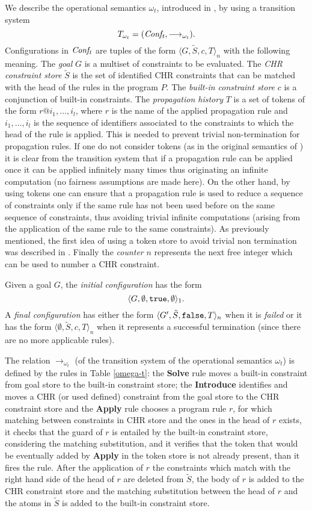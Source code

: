 \documentclass[final]{acmtrans2e}
\newcommand{\rrarrow}{\longrightarrow}
\begin{document}
We describe the operational semantics $\omega_t$, introduced in
\cite{DSGH04}, by using a transition system
\[T_{\omega_t}= ({\it Conf_t},
\rrarrow_{\omega_t}).\] Configurations in ${\it Conf_t}$ are
tuples of the form $\langle G,\tilde  S,c, T\rangle_n$ with the
following meaning. The \emph{goal} $G$ is a multiset of constraints to
be evaluated. The \emph{CHR constraint store} $\tilde S$ is the set of
identified CHR constraints that can be matched with the head of the
rules in the program $P$. The \emph{built-in constraint store} $c$ is a
conjunction of built-in constraints. The {\em propagation history}
$T$ is a set of tokens of the form $r@i_1, \ldots, i_l$, where $r$
is the name of the applied propagation rule and $i_1, \ldots, i_l$ is the
sequence of identifiers associated to the constraints to which the
head of the rule is applied. This is needed to prevent trivial
non-termination for propagation rules. If one do not consider
tokens (as in the original semantics of \cite{Fru98}) it is clear
from the transition system that if a propagation rule can be
applied once it can be applied infinitely many times thus
originating an infinite computation (no fairness assumptions are
made here). On the other hand, by using tokens one can ensure that
a propagation rule is used to reduce a sequence of constraints
only if the same rule has not been used before on the same
sequence of constraints, thus avoiding trivial infinite
computations (arising from the application of the same rule to the
same constraints). As previously mentioned, the first idea of using
a token store to avoid trivial non termination was described in
\cite{Abd97}. Finally the \emph{counter} $n$ represents the next
free integer which can be used to number a CHR constraint.


Given a goal $G$, the  {\em initial configuration} has the form
\[\langle G,\emptyset,{\tt true}, \emptyset \rangle_1.\]
A {\em final configuration} has either the form $\langle  G',
\tilde S, {\tt false} , T\rangle_n$ when it is {\em failed} or it
has the form $\langle \emptyset,\tilde S, c,T \rangle_n$ when it
represents a successful termination (since there are no more
applicable rules).


The relation $\rrarrow_{\omega_t}$ (of the transition system
of the operational semantics $\omega_t$) is defined  by the rules
in Table \ref{omega-t}: the \textbf{Solve} rule moves a
built-in constraint from goal store to the built-in constraint
store; the \textbf{Introduce} identifies and moves a CHR (or used
defined) constraint from the goal store to the CHR constraint
store and the \textbf{Apply} rule chooses a program rule $r$, for
which matching between constraints in CHR store and the ones in
the head of $r$ exists, it checks that the guard of $r$ is
entailed by the built-in constraint store, considering the
matching substitution, and it verifies that the token that would be
eventually added by \textbf{Apply} in the token store is not already
present, than it fires the rule. After the application of $r$
the constraints which match with the right hand side of the head
of $r$ are deleted from $\tilde S$, the body of $r$ is added to
the CHR constraint store and the matching substitution between
the head of $r$ and the atoms in $\tilde S$ is added to the
built-in constraint store.
\end{document}
